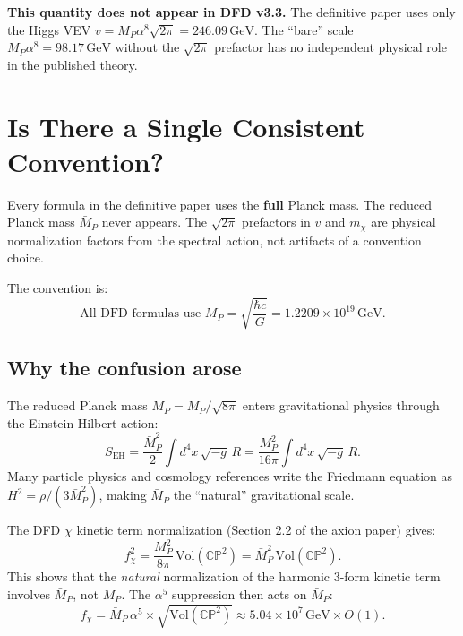 \documentclass[11pt]{article}
\newcommand{\MP}{M_P}
\newcommand{\MPbar}{\bar{M}_P}
\newcommand{\GeV}{\,\mathrm{GeV}}
\begin{document}
\textbf{This quantity does not appear in DFD v3.3.} The definitive paper
uses only the Higgs VEV $v = \MP\alpha^8\sqrt{2\pi} = 246.09\GeV$.
The ``bare'' scale $\MP\alpha^8 = 98.17\GeV$ without the $\sqrt{2\pi}$
prefactor has no independent physical role in the published theory.

\section{Is There a Single Consistent Convention?}

\begin{tcolorbox}[colback=green!5!white, colframe=green!60!black,
  title=\textbf{Answer: Yes. DFD v3.3 uses $\MP = \sqrt{\hbar c/G}$ uniformly.}]
Every formula in the definitive paper uses the \textbf{full} Planck mass.
The reduced Planck mass $\MPbar$ never appears. The $\sqrt{2\pi}$ prefactors
in $v$ and $m_\chi$ are physical normalization factors from the spectral
action, not artifacts of a convention choice.

The convention is:
\begin{equation}
\boxed{\text{All DFD formulas use }\MP = \sqrt{\frac{\hbar c}{G}}
= 1.2209 \times 10^{19}\GeV.}
\end{equation}
\end{tcolorbox}

\subsection{Why the confusion arose}

The reduced Planck mass $\MPbar = \MP/\sqrt{8\pi}$ enters gravitational
physics through the Einstein-Hilbert action:
\begin{equation}
  S_\mathrm{EH} = \frac{\MPbar^2}{2}\int d^4x\,\sqrt{-g}\,R
  = \frac{\MP^2}{16\pi}\int d^4x\,\sqrt{-g}\,R.
\end{equation}
Many particle physics and cosmology references write the Friedmann equation as
$H^2 = \rho/(3\MPbar^2)$, making $\MPbar$ the ``natural'' gravitational scale.

The DFD $\chi$ kinetic term normalization (Section 2.2 of the axion paper)
gives:
\begin{equation}
  f_\chi^2 = \frac{\MP^2}{8\pi}\,\mathrm{Vol}(\mathbb{CP}^2)
  = \MPbar^2\,\mathrm{Vol}(\mathbb{CP}^2).
\end{equation}
This shows that the \textit{natural} normalization of the harmonic 3-form
kinetic term involves $\MPbar$, not $\MP$. The $\alpha^5$ suppression then
acts on $\MPbar$:
\begin{equation}
  f_\chi = \MPbar\,\alpha^5 \times \sqrt{\mathrm{Vol}(\mathbb{CP}^2)}
  \approx 5.04 \times 10^7\GeV \times O(1).
\end{equation}
\end{document}
